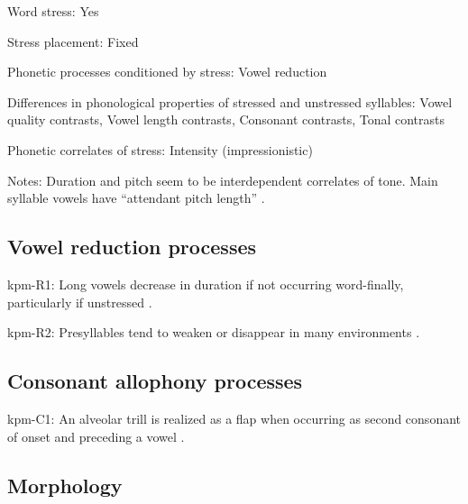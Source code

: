 {\begin{appendixdesc}
\item[Word stress:] Yes

\item[Stress placement:] Fixed

\item[Phonetic processes conditioned by stress:] Vowel reduction

\item[Differences in phonological properties of stressed and unstressed syllables:] Vowel quality contrasts, Vowel length contrasts, Consonant contrasts, Tonal contrasts

\item[Phonetic correlates of stress:] Intensity (impressionistic)

\item[Notes:] Duration and pitch seem to be interdependent correlates of tone. Main syllable vowels have “attendant pitch length” \citep[32]{Olsen2014}.
\end{appendixdesc}
\subsection*{Vowel reduction processes}
\begin{appendixdesc}

\item[kpm-R1:]  Long vowels decrease in duration if not occurring word-finally, particularly if unstressed \citep[33]{Olsen2014}.

\item[kpm-R2:] Presyllables tend to weaken or disappear in many environments \citep[31]{Olsen2014}.
\end{appendixdesc}
\subsection*{Consonant allophony processes}
\begin{appendixdesc}

\item[kpm-C1:] An alveolar trill is realized as a flap when occurring as second consonant of onset and preceding a vowel \citep[24]{Olsen2014}.
\end{appendixdesc}
\subsection*{Morphology}

\begin{appendixdesc}


\end{appendixdesc}}
